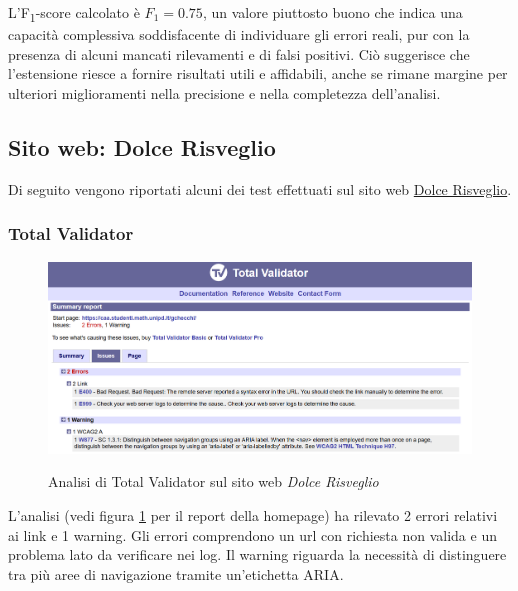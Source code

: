 \noindent L'F\textsubscript{1}-score calcolato è $F_{1}=0.75$, un valore piuttosto buono che indica una capacità complessiva soddisfacente di individuare gli errori reali, pur con la presenza di alcuni mancati rilevamenti e di falsi positivi. 
Ciò suggerisce che l’estensione riesce a fornire risultati utili e affidabili, anche se rimane margine per ulteriori miglioramenti nella precisione e nella completezza dell’analisi.

\vspace{0.5cm}
\subsection{Sito web: Dolce Risveglio}
\noindent Di seguito vengono riportati alcuni dei test effettuati sul sito web \href{https://caa.studenti.math.unipd.it/gchecchi/}{Dolce Risveglio}.

\subsubsection{Total Validator}
\begin{figure}[H]
    \centering
    \includegraphics[width=0.9\linewidth, alt={Screenshot dell'analisi di Total Validator sul sito web Dolce Risveglio}]{img/TV_dolcerisveglio.png}
    \caption{Analisi di Total Validator sul sito web \textit{Dolce Risveglio}}\label{fig:TV_dolcerisveglio}
\end{figure}

\noindent L'analisi (vedi figura \ref{fig:TV_dolcerisveglio} per il report della homepage) ha rilevato 2 errori relativi ai link e 1 warning. 
Gli errori comprendono un \acrshort{url} con richiesta non valida e un problema lato  da verificare nei log. 
Il warning riguarda la necessità di distinguere tra più aree di navigazione tramite un'etichetta ARIA. 

